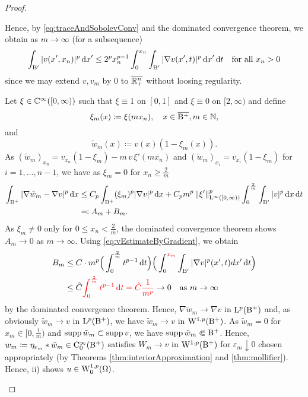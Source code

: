 \begin{proof}
\begin{enumerate}[i)]
    Hence, by \eqref{eq:traceAndSobolevConv} and the dominated convergence theorem, we obtain as $m \to \infty$ (for a subsequence)
    \begin{equation}
      \label{eq:vEstimateByGradient}
      \int_{\mathrm{B}'} |v(x',x_n)|^p \, {\operatorname{d}\!{x}}'
      \leq 2^p x_n^{p - 1} \int_0^{x_n} \int_{\mathrm{B}'} |\nabla v(x',t)|^p \, {\operatorname{d}\!{x}}' \, {\operatorname{d}\!{t}} \quad\text{for all } x_n > 0
    \end{equation}
    since we may extend $v, v_m$ by $0$ to $\overline{\mathbb{R}^n_+}$ without loosing regularity.

    Let $\xi \in \mathbb{C}^\infty([0,\infty))$ such that $\xi \equiv 1$ on $[0,1]$ and $\xi \equiv 0$ on $[2,\infty)$ and define 
      $$\xi_m (x) \coloneqq \xi(mx_n), \quad x \in \overline{\mathrm{B}^+}, m \in \mathbb{N},$$ and 
      $$\tilde w_m(x) \coloneqq v(x)(1 - \xi_m(x)).$$
      As $(\tilde w_m)_{x_n} = v_{x_n}(1 - \xi_m) - m\, v\, \xi'(m x_n)$ and $(\tilde w_m)_{x_i} = v_{x_i}(1 - \xi_m)$ for $i = 1,\dots,n-1$, we have as $\xi_m =0$ for $x_n \geq \frac{2}{m}$
      \begin{align*}
      \int_{\mathrm{B}^+} |\nabla \tilde w_m - \nabla v|^p \, {\operatorname{d}\!{x}}
      &\leq C_p \int_{\mathrm{B}^+} (\xi_m)^p |\nabla v|^p \, {\operatorname{d}\!{x}} + C_p m^p\, \|\xi'\|_{\mathrm{L}^\infty([0,\infty))}^p \int_0^{\frac{2}{m}} \int_{\mathrm{B}'} |v|^p \, {\operatorname{d}\!{x}} \, {\operatorname{d}\!{t}} \\
        &\eqqcolon A_m + B_m.
      \end{align*}
      As $\xi_m \neq 0$ only for $0 \leq x_n < \frac{2}{m}$, the dominated convergence theorem shows $A_m \to 0$ as $m \to \infty$.
      Using \eqref{eq:vEstimateByGradient}, we obtain
      \begin{align*}
      B_m 
      &\leq C \cdot m^p \Big( \int_0^{\frac{2}{m}} t^{p - 1} \, {\operatorname{d}\!{t}} \Big) \Big( \int_0^{\textcolor{red}{x_m}} \int_{\mathrm{B}'} |\nabla v|^p(x',t) d x' \, {\operatorname{d}\!{t}} \Big) \\
      &\leq \tilde C \textcolor{red}{\int_0^{\frac{2}{m}} t^{p - 1} \, {\operatorname{d}\!{t}} = \hat C \frac{1}{m^p}} \to 0 \quad\text{as } m \to \infty
      \end{align*}
      by the dominated convergence theorem.
      Hence, $\nabla \tilde w_m \to \nabla v$ in $\mathrm{L}^p(\mathrm{B}^+)$ and, as obviously $\tilde w_m \to v$ in $\mathrm{L}^p(\mathrm{B}^+)$, we have $\tilde w_m \to v$ in $\mathrm{W}^{1,p}(\mathrm{B}^+)$.
      As $\tilde w_m = 0$ for $x_m \in [0,\frac{1}{m})$ and $\operatorname{supp} \tilde w_m \subset \operatorname{supp} v$, we have $\operatorname{supp} \tilde w_m \Subset \mathrm{B}^+$.
        Hence, $w_m \coloneqq \eta_{\varepsilon_m} \ast \tilde w_m \in \mathrm{C}_0^\infty(\mathrm{B}^+)$ satisfies $W_m \to v$ in $\mathrm{W}^{1,p}(\mathrm{B}^+)$ for $\varepsilon_m \downarrow 0$ chosen appropriately (by Theorems \ref{thm:interiorApproximation} and \ref{thm:mollifier}).
        Hence, ii) shows $u \in \mathrm{W}_0^{1,p}(\Omega)$.
  \end{enumerate}
\end{proof}
